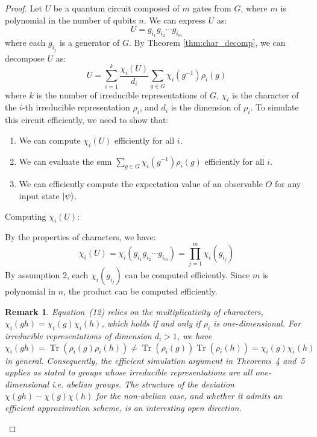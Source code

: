 \documentclass[11pt,a4paper]{article}
\newtheorem{remark}{Remark}
\DeclareMathOperator{\Tr}{Tr}
\begin{document}
\begin{proof}
Let $U$ be a quantum circuit composed of $m$ gates from $G$, where $m$ is polynomial in the number of qubits $n$. We can express $U$ as:
\begin{equation}
U = g_{i_1} g_{i_2} \cdots g_{i_m}
\end{equation}
where each $g_{i_j}$ is a generator of $G$. By Theorem \ref{thm:char_decomp}, we can decompose $U$ as:
\begin{equation}
U = \sum_{i=1}^k \frac{\chi_i(U)}{d_i} \sum_{g \in G} \chi_i(g^{-1}) \rho_i(g)
\end{equation}
where $k$ is the number of irreducible representations of $G$, $\chi_i$ is the character of the $i$-th irreducible representation $\rho_i$, and $d_i$ is the dimension of $\rho_i$.
To simulate this circuit efficiently, we need to show that:
\begin{enumerate}
\item We can compute $\chi_i(U)$ efficiently for all $i$.
\item We can evaluate the sum $\sum_{g \in G} \chi_i(g^{-1}) \rho_i(g)$ efficiently for all $i$.
\item We can efficiently compute the expectation value of an observable $O$ for any input state $\ket{\psi}$.
\end{enumerate}

\noindent

Computing $\chi_i(U)$:

By the properties of characters, we have:
\begin{equation}
\chi_i(U) = \chi_i(g_{i_1} g_{i_2} \cdots g_{i_m}) = \prod_{j=1}^m \chi_i(g_{i_j})
\end{equation}
By assumption 2, each $\chi_i(g_{i_j})$ can be computed efficiently. Since $m$ is polynomial in $n$, the product can be computed efficiently.

\begin{remark}
\label{rmk:char_mult}
Equation~(12) relies on the multiplicativity of characters, 
$\chi_i(gh) = \chi_i(g)\chi_i(h)$, which holds if and only if 
$\rho_i$ is one-dimensional. For irreducible representations of 
dimension $d_i > 1$, we have \[\chi_i(gh) = \Tr(\rho_i(g)\rho_i(h)) 
\neq \Tr(\rho_i(g))\Tr(\rho_i(h)) = \chi_i(g)\chi_i(h)\] in general. 
Consequently, the efficient simulation argument in Theorems~4 and~5 
applies as stated to groups whose irreducible representations are all 
one-dimensional i.e. abelian groups. The structure of the 
deviation $\chi(gh) - \chi(g)\chi(h)$ for the non-abelian case, and 
whether it admits an efficient approximation scheme, is an interesting 
open direction.
\end{remark}


\end{proof}
\end{document}
